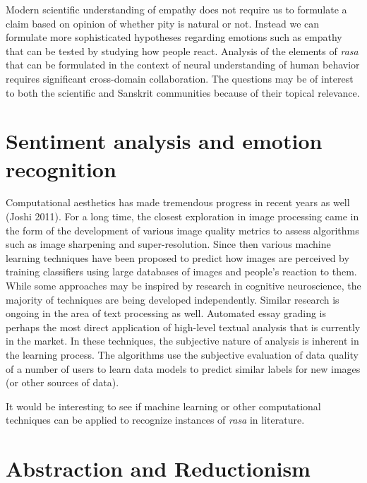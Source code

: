 Modern scientific understanding of empathy does not require us to formulate a claim based on opinion of whether pity is natural or not. Instead we can formulate more sophisticated hypotheses regarding emotions such as empathy that can be tested by studying how people react. Analysis of the elements of \textsl{rasa} that can be formulated in the context of neural understanding of human behavior requires significant cross-domain collaboration. The questions may be of interest to both the scientific and Sanskrit communities because of their topical relevance. 

\section*{Sentiment analysis and emotion recognition}

Computational aesthetics has made tremendous progress in recent years as well (Joshi 2011). For a long time, the closest exploration in image processing came in the form of the development of various image quality metrics to assess algorithms such as image sharpening and super-resolution. Since then various machine learning techniques have been proposed to predict how images are perceived by training classifiers using large databases of images and people’s reaction to them. While some approaches may be inspired by research in cognitive neuroscience, the majority of techniques are being developed independently. Similar research is ongoing in the area of text processing as well. Automated essay grading is perhaps the most direct application of high-level textual analysis that is currently in the market. In these techniques, the subjective nature of analysis is inherent in the learning process. The algorithms use the subjective evaluation of data quality of a number of users to learn data models to predict similar labels for new images (or other sources of data).

It would be interesting to see if machine learning or other computational techniques can be applied to recognize instances of \textsl{rasa} in literature.\\[-21pt]

\section*{Abstraction and Reductionism}

